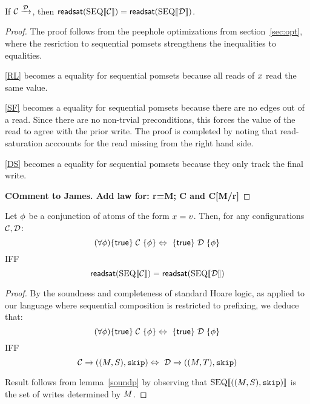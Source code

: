 \begin{lemma}\label{soundp}
If ${\mathcal C} \xrightarrow {{\mathcal D}}$, then $\mathsf{readsat}({\rm SEQ}\llbracket{\mathcal C}\rrbracket) = \mathsf{readsat}({\rm SEQ}\llbracket{\mathcal D}\rrbracket)$.
\end{lemma}
\begin{proof}
The proof follows from the peephole optimizations from section~\ref{sec:opt}, where the resriction to sequential pomsets strengthens the inequalities to equalities.    

\eqref{RL} becomes a equality for sequential pomsets because all reads of $x$ read the same value.  

\eqref{SF} becomes a equality for sequential pomsets because there are no edges out of a read. Since there are no non-trvial preconditions, this forces the value of the read to agree with the prior write.   The proof is completed by noting that read-saturation acccounts for the read missing from the right hand side.

\eqref{DS}  becomes a equality for sequential pomsets because they only track the final write. 

{\bf COmment to James.  Add law for:  r=M; C and C[M/r]}
\end{proof}

\begin{corollary}
Let $\phi$ be a conjunction of atoms of the form $x = v$.  Then, for any configurations ${\mathcal C}, {\mathcal D}$:
\[ (\forall \phi) \{\mathsf{true}\}\allowbreak\;{\mathcal C}\;\allowbreak\{\phi\} \Leftrightarrow\   \{\mathsf{true}\}\allowbreak\;{\mathcal D}\;\allowbreak\{\phi\}  \]
IFF
\[ \mathsf{readsat}({\rm SEQ}\llbracket{\mathcal C}\rrbracket) = \mathsf{readsat}({\rm SEQ}\llbracket{\mathcal D}\rrbracket) \]
\end{corollary}
\begin{proof}
By the soundness and completeness of standard Hoare logic, as applied to our language where sequential composition is restricted to prefixing, we deduce that:
\[ (\forall \phi) \{\mathsf{true}\}\allowbreak\;{\mathcal C}\;\allowbreak\{\phi\} \Leftrightarrow\   \{\mathsf{true}\}\allowbreak\;{\mathcal D}\;\allowbreak\{\phi\} 
\]
IFF
\[ {\mathcal C} \xrightarrow{} ((M,S), \texttt{skip}) \Leftrightarrow\  {\mathcal D} \xrightarrow{} ((M,T), \texttt{skip}) \]

Result follows from lemma~\ref{soundp} by observing that ${\rm SEQ}\llbracket((M,S), \texttt{skip})\rrbracket$ is the set of writes determined by $M$.
\end{proof}


\endinput






For such commands, we establish the relationship between the sequential semantics and the pomset semantics. 



